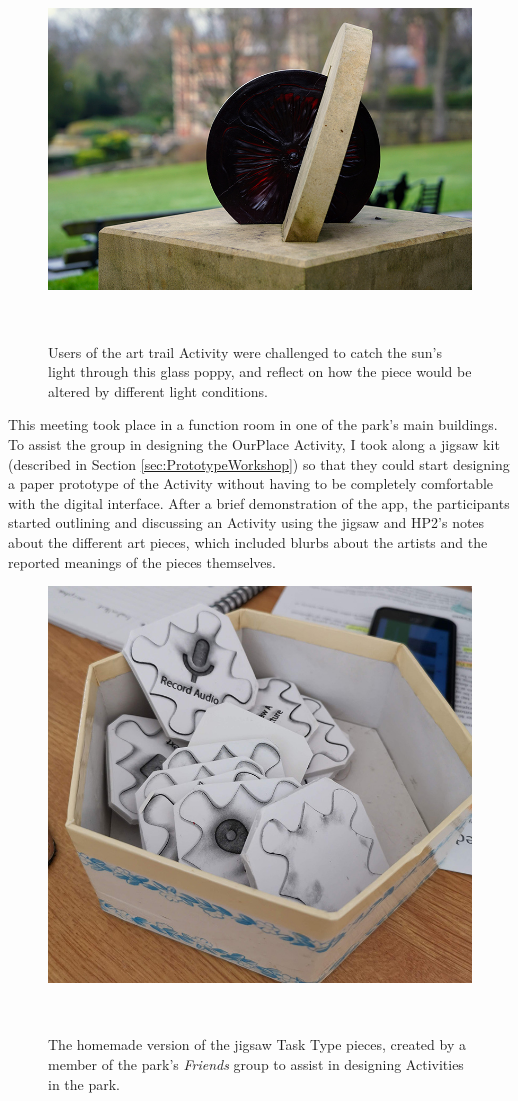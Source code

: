 \begin{figure}
  \centering
  \includegraphics[width=0.7\columnwidth]{images/chapter06/artpiece.jpg}
  \caption[An art piece which was used in an OurPlace Task]{Users of the art trail Activity were challenged to catch the sun's light through this glass poppy, and reflect on how the piece would be altered by different light conditions.}~\label{fig:ParkArt}
\end{figure}

This meeting took place in a function room in one of the park's main buildings. To assist the group in designing the OurPlace Activity, I took along a jigsaw kit (described in Section \ref{sec:PrototypeWorkshop}) so that they could start designing a paper prototype of the Activity without having to be completely comfortable with the digital interface. After a brief demonstration of the app, the participants started outlining and discussing an Activity using the jigsaw and HP2's notes about the different art pieces, which included blurbs about the artists and the reported meanings of the pieces themselves. 

\begin{figure}
  \centering
  \includegraphics[width=0.65\columnwidth]{images/chapter06/DIY_jigsaws.jpg}
  \caption[Homemade jigsaw pieces created by a \textit{Friends} of the park group member.]{The homemade version of the jigsaw Task Type pieces, created by a member of the park's \textit{Friends} group to assist in designing Activities in the park.}~\label{fig:DIYJigsaw}
\end{figure}

